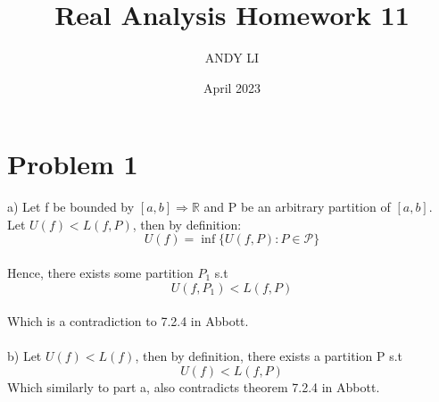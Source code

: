 \documentclass{article}
\title{Real Analysis Homework 11}
\author{ANDY LI}
\date{April 2023}
\begin{document}
\maketitle
\section*{Problem 1}
a) Let f be bounded by $[a, b] \Rightarrow \mathbb{R}$ and P be an arbitrary partition of $[a, b]$.
\\Let $U(f) < L(f, P)$, then by definition:
$$U(f) = \inf\{U(f, P) : P \in \mathcal{P}\}$$
\\Hence, there exists some partition $P_1$ s.t $$U(f, P_1) < L(f, P)$$
\\Which is a contradiction to 7.2.4 in Abbott.
\\
\\b) Let $U(f) < L(f)$, then by definition, there exists a partition P s.t $$U(f) < L(f, P)$$ Which similarly to part a, also contradicts theorem 7.2.4 in Abbott.
\end{document}
